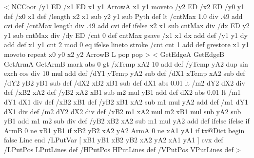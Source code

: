%
%
%
%
<{
  NCCoor
  /y1 ED /x1 ED x1 y1 ArrowA x1 y1 moveto
  /y2 ED /x2 ED
  /y0 y1 def /x0 x1 def
  /length x2 x1 sub y2 y1 sub Pyth def
  \psk@dashNo{} lt
     {/cntMax 1.0 \psk@dashNo\space div .49 add cvi def}
     {/cntMax length \psk@dashNo\space div .49 add cvi def} ifelse
  x2 x1 sub cntMax div /dx ED
  y2 y1 sub cntMax div /dy ED
  /cnt 0 def
  cntMax {
    gsave
    /x1 x1 dx add def
    /y1 y1 dy add def
    x1 y1
    cnt 2 mod 0 eq
      { \pst@usecolor\psDashColorI }
      { \pst@usecolor\psDashColorII } ifelse
    lineto stroke
    /cnt cnt 1 add def
    grestore
    x1 y1 moveto
  } repeat
  x0 y0 x2 y2 ArrowB L pop pop%
}>
%
\def\nclineII{\pst@object{nclineII}}%
\def\nclineII@i{\check@arrow{\nclineII@ii}}%
\def\nclineII@ii#1#2{\nc@object{Open}{#1}{#2}{.5}%
    {\tx@NCLineII /LPutPos { xB yB xA yA \tx@LPutLine } def}%
}%
\def\pclineII{\pst@object{pclineII}}%
\def\pclineII@i{\pc@object\nclineII@ii}%
%
%
%
%
<{
  GetEdgeA GetEdgeB GetArmA GetArmB mark
  \psk@lineAngle\space abs 0 gt {
    /xTemp xA2 10 add def
    /yTemp yA2 \psk@lineAngle\space dup sin exch cos div 10 mul add def
    /dY1 yTemp yA2 sub def
    /dX1 xTemp xA2 sub def
    /dY2 yB2 yB1 sub def
    /dX2 xB2 xB1 sub def
    dX1 abs 0.01 lt {
      /m2 dY2 dX2 div def
      /xB2 xA2 def
      /yB2 xA2 xB1 sub m2 mul yB1 add def
    }{
      dX2 abs 0.01 lt {
        /m1 dY1 dX1 div def
        /xB2 xB1 def
        /yB2 xB1 xA2 sub m1 mul yA2 add def
      }{%
        /m1 dY1 dX1 div def
        /m2 dY2 dX2 div def
        /xB2 m1 xA2 mul m2 xB1 mul sub yA2 sub yB1 add m1 m2 sub div def
        /yB2 xB2 xA2 sub m1 mul yA2 add def
      } ifelse
    } ifelse
  } if
  ArmB 0 ne { xB1 yB1 } if
  xB2 yB2
  xA2 yA2
  ArmA 0 ne { xA1 yA1 } if
  tx@Dict begin false Line end
  /LPutVar [ xB1 yB1 xB2 yB2 xA2 yA2 xA1 yA1 ] cvx def
  /LPutPos { LPutLines } def
  /HPutPos { HPutLines } def
  /VPutPos { VPutLines } def
}>
